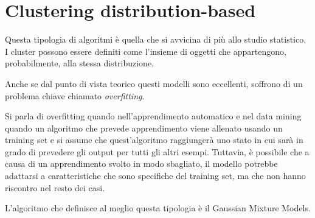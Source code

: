 \section{Clustering distribution-based}
	Questa tipologia di algoritmi è quella che si avvicina di più allo studio statistico. I cluster possono essere definiti come l'insieme di oggetti che appartengono, probabilmente, alla stessa distribuzione\cite{distribution-based_clustering}.

	Anche  se dal punto di vista teorico questi modelli sono eccellenti, soffrono di un problema chiave chiamato \emph{overfitting}. 

	Si parla di overfitting quando nell'apprendimento automatico e nel data mining quando un algoritmo che prevede apprendimento viene allenato usando un training set e si assume che quest'algoritmo raggiungerà uno stato in cui sarà in grado di prevedere gli output per tutti gli altri esempi. Tuttavia, è possibile che a causa di un apprendimento svolto in modo sbagliato, il modello potrebbe adattarsi a caratteristiche che sono specifiche del training set, ma che non hanno riscontro nel resto dei casi\cite{overfitting}.

	L'algoritmo che definisce al meglio questa tipologia è il Gaussian Mixture Models.
